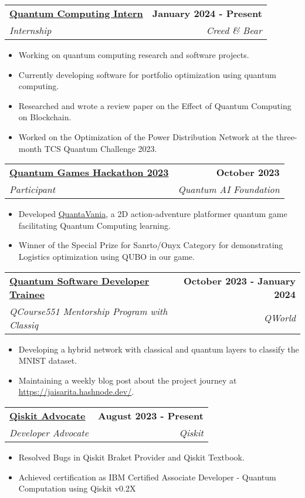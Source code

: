 \documentclass[letterpaper,11pt]{article}
\makeatletter
\newcommand{\resumeItem}[1]{
  \item\small{
    {#1 \vspace{-2pt}}
  }
}
\newcommand{\resumeSubheading}[4]{
  \vspace{-2pt}\item
    \begin{tabular*}{1.0\textwidth}[t]{l@{\extracolsep{\fill}}r}
      \textbf{#1} & \textbf{\small #2} \\
      \textit{\small#3} & \textit{\small #4} \\
    \end{tabular*}\vspace{-7pt}
}
\newcommand{\resumeItemListStart}{\begin{itemize}}
\newcommand{\resumeItemListEnd}{\end{itemize}\vspace{-5pt}}
\makeatother
\begin{document}
    \resumeSubheading
        {\href{https://creedandbear.com/}{Quantum Computing Intern}}{January 2024 - Present}
        {Internship}{Creed \& Bear}
        \vspace{-6pt}
        \resumeItemListStart
            \resumeItem{Working on quantum computing research and software projects.}
            \resumeItem{Currently developing software for portfolio optimization using quantum computing.}
            \resumeItem{Researched and wrote a review paper on the Effect of Quantum Computing on Blockchain.}
            \resumeItem{Worked on the Optimization of the Power Distribution Network at the three-month TCS Quantum Challenge 2023.}
        \resumeItemListEnd
            
    \resumeSubheading
        {\href{https://www.qaif.org/contests/quantum-games-hackathon}
        {Quantum Games Hackathon 2023}}{October 2023}
        {Participant}{Quantum AI Foundation}
        \resumeItemListStart
            \resumeItem{Developed \underline{\href{https://github.com/devilkiller-ag/QuantaVania}{QuantaVania}}, a 2D action-adventure platformer quantum game facilitating Quantum Computing learning.}
            \resumeItem{Winner of the Special Prize for Sanrto/Onyx Category for demonstrating Logistics optimization using QUBO in our game.}
        \resumeItemListEnd
        
    \resumeSubheading
            {\href{https://qworld.net/qcourse551-1/}
            {Quantum Software Developer Trainee}}{October 2023 - January 2024}
            {QCourse551 Mentorship Program with Classiq}{QWorld}
            \resumeItemListStart
                \resumeItem{Developing a hybrid network with classical and quantum layers to classify the MNIST dataset.}
                \resumeItem{Maintaining a weekly blog post about the project journey at \underline{\href{https://jaisarita.hashnode.dev/reflection-on-my-quantum-software-developer-journey-at-qworld-classiq-implementing-quantum-neural-network-algorithm}{https://jaisarita.hashnode.dev/}}.}
            \resumeItemListEnd

    \newpage
    
    \resumeSubheading
        {\href{https://qiskit.org/advocates}
        {Qiskit Advocate}}{August 2023 - Present}
        {Developer Advocate}{Qiskit}
        \resumeItemListStart
            \resumeItem{Resolved Bugs in Qiskit Braket Provider and Qiskit Textbook.}
            \resumeItem{Achieved certification as IBM Certified Associate Developer - Quantum Computation using Qiskit v0.2X}
        \resumeItemListEnd
    
\end{document}
